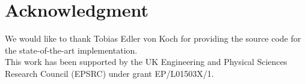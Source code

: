\documentclass[conference,10pt]{IEEEtran}
\begin{document}
\maketitle












%







\section*{Acknowledgment}
  We would like to thank Tobias Edler von Koch for providing the source
code for the state-of-the-art implementation.
  \\
  This work has been supported by the UK Engineering and Physical Sciences Research Council (EPSRC) under grant EP/L01503X/1.


%








\clearpage
\balance



\end{document}
